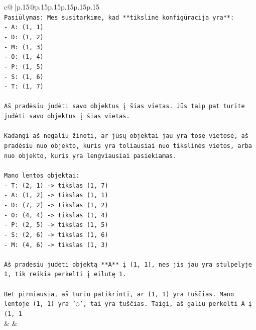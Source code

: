 \documentclass{article}
\begin{document}
{\begin{supertabular}{c@{$\;$}|p{.15\linewidth}@{}p{.15\linewidth}p{.15\linewidth}p{.15\linewidth}p{.15\linewidth}p{.15\linewidth}}
{{{\\ 
\texttt{Pasiūlymas: Mes susitarkime, kad **tikslinė konfigūracija yra**:} \\
\texttt{{-} A: (1, 1)} \\
\texttt{{-} D: (1, 2)} \\
\texttt{{-} M: (1, 3)} \\
\texttt{{-} O: (1, 4)} \\
\texttt{{-} P: (1, 5)} \\
\texttt{{-} S: (1, 6)} \\
\texttt{{-} T: (1, 7)} \\
\\ 
\texttt{Aš pradėsiu judėti savo objektus į šias vietas. Jūs taip pat turite judėti savo objektus į šias vietas.} \\
\\ 
\texttt{Kadangi aš negaliu žinoti, ar jūsų objektai jau yra tose vietose, aš pradėsiu nuo objekto, kuris yra toliausiai nuo tikslinės vietos, arba nuo objekto, kuris yra lengviausiai pasiekiamas.} \\
\\ 
\texttt{Mano lentos objektai:} \\
\texttt{{-} T: (2, 1) {-}> tikslas (1, 7)} \\
\texttt{{-} A: (1, 2) {-}> tikslas (1, 1)} \\
\texttt{{-} D: (7, 2) {-}> tikslas (1, 2)} \\
\texttt{{-} O: (4, 4) {-}> tikslas (1, 4)} \\
\texttt{{-} P: (2, 5) {-}> tikslas (1, 5)} \\
\texttt{{-} S: (2, 6) {-}> tikslas (1, 6)} \\
\texttt{{-} M: (4, 6) {-}> tikslas (1, 3)} \\
\\ 
\texttt{Aš pradėsiu judėti objektą **A** į (1, 1), nes jis jau yra stulpelyje 1, tik reikia perkelti į eilutę 1.} \\
\\ 
\texttt{Bet pirmiausia, aš turiu patikrinti, ar (1, 1) yra tuščias. Mano lentoje (1, 1) yra '◌', tai yra tuščias. Taigi, aš galiu perkelti A į (1, 1} \\
            }
        }
    }
    & & \\ \\


\end{supertabular}}
\end{document}
